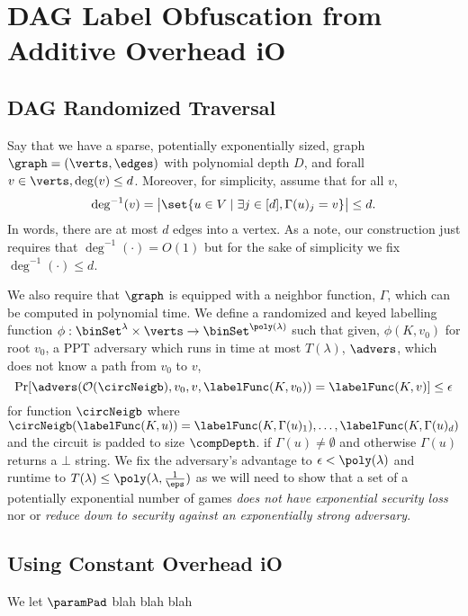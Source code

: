 \section{DAG Label Obfuscation from Additive Overhead iO}
\subsection{DAG Randomized Traversal}
Say that we have a sparse, potentially exponentially sized, graph $\graph = (\verts, \edges)$ with polynomial depth $D$,
and forall $v \in \verts, \deg(v) \leq d$. Moreover, for simplicity,
assume that for all $v$, 
$$
\deg^{-1}(v) = \big|\set{u \in V \mid \exists j \in [d], \Gamma(u)_j = v}\big| \leq d.
$$
In words, there are at most $d$ edges into a vertex. As a note, our construction just requires
that $\deg^{-1}(\cdot) = O(1)$ but for the sake of simplicity we fix $\deg^{-1}(\cdot) \leq d$.

We also require that $\graph$ is equipped with a neighbor function, $\Gamma$, which can be computed in polynomial time.
We define a randomized and keyed labelling function $\phi: \binSet^\lambda \times \verts \rightarrow \binSet^{\poly(\lambda)}$ 
such that given, $\phi(K, v_0)$ for root $v_0$, a PPT adversary which runs in time at most $T(\lambda)$, $\advers$, which does not know a path from $v_0$ to $v$,
\begin{equation}
	\label{eq:guessPhi}
	\Pr[\advers(\mathcal{O}(\circNeigb), v_0, v, \labelFunc(K, v_0)) = \labelFunc(K, v)] \leq \epsilon
\end{equation}
for function $\circNeigb$ where $\circNeigb(\labelFunc(K, u)) = \labelFunc(K, \Gamma(u)_1), \dots, \labelFunc(K, \Gamma(u)_d)$ and the circuit is padded to size $\compDepth$.
if $\Gamma(u) \neq \emptyset$ and otherwise $\Gamma(u)$ returns a $\bot$ string.
We fix the adversary's advantage to $\epsilon < \poly(\lambda)$ and runtime to $T(\lambda) \leq \poly(\lambda, \frac{1}{\eps})$
as we will need to show
that a set of a potentially exponential number of games \emph{does not have exponential security loss}
nor or \emph{reduce down to security against an exponentially strong adversary}.

\subsection{Using Constant Overhead iO}
\label{def:constOverheadParam}

We let $\paramPad$ blah blah blah

